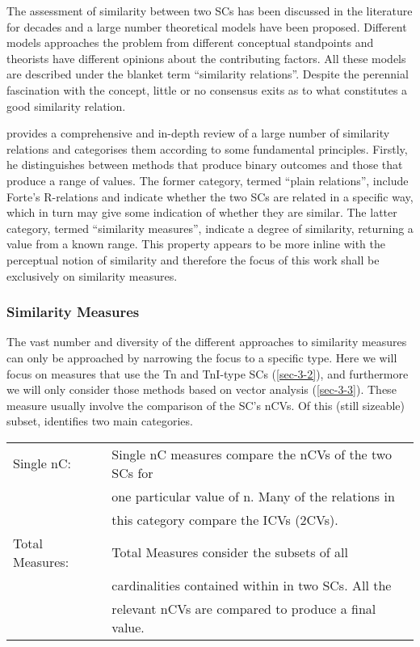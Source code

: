 \documentclass{article}
\begin{document}
The assessment of similarity between two SCs has been discussed in the
literature for decades and a large number theoretical models have been
proposed. Different models approaches the problem from different
conceptual standpoints and theorists have different opinions about the
contributing factors. All these models are described under the blanket
term ``similarity relations''. Despite the perennial fascination with
the concept, little or no consensus exits as to what constitutes a
good similarity relation.

\citet{Castren1994} provides a comprehensive and in-depth review of a
large number of similarity relations and categorises them according to
some fundamental principles. Firstly, he distinguishes between methods
that produce binary outcomes and those that produce a range of
values. The former category, termed ``plain relations'', include Forte's
R-relations \citep{Forte1973} and indicate whether the two SCs are
related in a specific way, which in turn may give some indication of
whether they are similar. The latter category, termed ``similarity
measures'', indicate a degree of similarity, returning a value from a
known range. This property appears to be more inline with the
perceptual notion of similarity and therefore the focus of this work
shall be exclusively on similarity measures.
\subsubsection{Similarity Measures}
\label{sec-3-4-2}

The vast number and diversity of the different approaches to similarity
measures can only be approached by narrowing the focus to a specific
type. Here we will focus on measures that use the Tn and TnI-type SCs
(\ref{sec-3-2}), and furthermore we will only consider those
methods based on vector analysis (\ref{sec-3-3}). These measure
usually involve the comparison of the SC's nCVs. Of this (still
sizeable) subset, \citet{Castren1994} identifies two main categories.

\begin{center}
\begin{tabular}{ll}
 Single nC:       &  Single nC measures compare the nCVs of the two SCs for  \\
                  &  one particular value of n. Many of the relations in     \\
                  &  this category compare the ICVs (2CVs).                  \\
 Total Measures:  &  Total Measures consider the subsets of all              \\
                  &  cardinalities contained within in two SCs. All the      \\
                  &  relevant nCVs are compared to produce a final value.    \\
\end{tabular}
\end{center}
\end{document}
